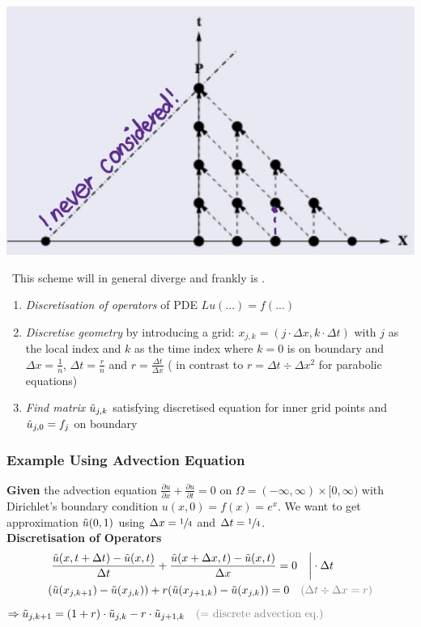 
\includegraphics[width=0.3\columnwidth]{images/downwind_scheme}

{\color{orange}\faWarning\ This scheme will in general diverge and frankly is \faTrash.}

\begin{enumerate}
	\item \emph{Discretisation of operators} of PDE $Lu(...)=f(...)$
	\item{
		\emph{Discretise geometry} by introducing a grid:
		$x_{j,k} = (j\cdot\Delta x, k\cdot\Delta t)$ with $j$ as the local index
		and $k$ as the time index where $k=0$ is on boundary
		and \colorbox{shadecolor}{$\Delta x = \frac{1}{n}$},
		\colorbox{shadecolor}{$\Delta t = \frac{r}{n}$}
		and \colorbox{shadecolor}{$r = \frac{\Delta t}{\Delta x}$} 
		({\color{orange}\faWarning} in contrast to $r=\Delta t\div\Delta x^2$ for parabolic equations)
	}
	\item{
		\emph{Find matrix $\tilde{u}_{j,k}$} satisfying discretised equation for inner grid points
		and $\tilde{u}_{j,0}=f_j$ on boundary
	}
\end{enumerate}

\subsubsection{Example Using Advection Equation}

\textbf{Given} the advection equation 
$\frac{\partial u}{\partial x} + \frac{\partial u}{\partial t} = 0$ on
$\Omega = (-\infty,\infty)\times[0,\infty)$ with Dirichlet's boundary condition
$u(x,0) = f(x) = e^x$. We want to get approximation $\tilde{u}(0,1)$ using
$\Delta x = \sfrac{1}{4}$ and $\Delta t = \sfrac{1}{4}$.
\\[1em]
\textbf{Discretisation of Operators}
\begin{align*}
	& \left.{\frac{\utild(x,t+\Delta t)-\utild(x,t)}{\Delta t}}
	+ {\frac{\utild(x+\Delta x,t)-\utild(x,t)}{\Delta x}} = 0\quad\right|\cdot \Delta t \\
	& (\utild(x_{j,k+1})-\utild(x_{j,k}))+r(\utild(x_{j+1,k})-\utild(x_{j,k}))=0
	{\color{gray} \quad(\Delta t\div\Delta x = r)}
\end{align*}
\colorbox{shadecolor}{$
	\displaystyle
	\Rightarrow \utild_{j,k+1}
	= \left(1+r\right)\cdot\utild_{j,k}-r\cdot\utild_{j+1,k}
	{\color{gray}\quad\text{(= discrete advection eq.)}}
$}

